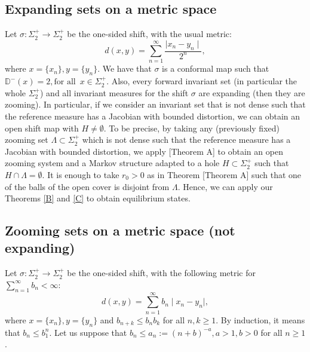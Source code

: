 \documentclass[12pt,a4paper]{amsart}
\theoremstyle{plain}
\begin{document}
\subsection{Expanding sets on a metric space} Let $\sigma : \Sigma_{2}^{+} \to \Sigma_{2}^{+}$ be the one-sided shift, with the usual metric:
\[
\displaystyle d(x,y) = \sum_{n=1}^{\infty} \frac{\mid x_{n} - y_{n} \mid}{2^{n}},
\]
where $x = \{x_{n}\}, y = \{y_{n}\}$. We have that $\sigma$ is a conformal map such that $\mathbb{D}^{-}(x) = 2, \text{for all} \, \, \, x \in \Sigma_{2}^{+}$. Also, every forward invariant set (in particular the whole $\Sigma_{2}^{+}$)  and all invariant measures for the shift $\sigma$ are expanding (then they are zooming). In particular, if we consider an invariant set that is not dense such that the reference measure has a Jacobian with bounded distortion, we can obtain an open shift map with $H \neq \emptyset$. To be precise, by taking any (previously fixed) zooming set $\Lambda \subset \Sigma_{2}^{+}$ which is not dense such that the reference measure has a Jacobian with bounded distortion, we apply \cite{S}[Theorem A] to obtain an open zooming system and a Markov structure adapted to a hole $H \subset \Sigma_{2}^{+}$ such that $H \cap \Lambda = \emptyset$. It is enough to take $r_{0}>0$ as in Theorem \cite{S}[Theorem A] such that one of the balls of the open cover is disjoint from $\Lambda$. Hence, we can apply our Theorems \ref{B} and \ref{C} to obtain equilibrium states.

\subsection{Zooming sets on a metric space (not expanding)} Let $\sigma : \Sigma_{2}^{+} \to \Sigma_{2}^{+}$ be the one-sided shift, with the following metric for $\sum_{n=1}^{\infty} b_{n} < \infty$:
\[
\displaystyle d(x,y) = \sum_{n=1}^{\infty} b_{n}\mid x_{n} - y_{n} \mid,
\]
where $x = \{x_{n}\}, y = \{y_{n}\}$ and $b_{n+k} \leq b_{n}b_{k}$ for all $n,k \geq 1$. By induction, it means that $b_{n} \leq b_{1}^{n}$. Let us suppose that $b_{n} \leq a_{n}:=(n+b)^{-a}, a>1, b>0$ for all $n \geq 1$. 
\end{document}
